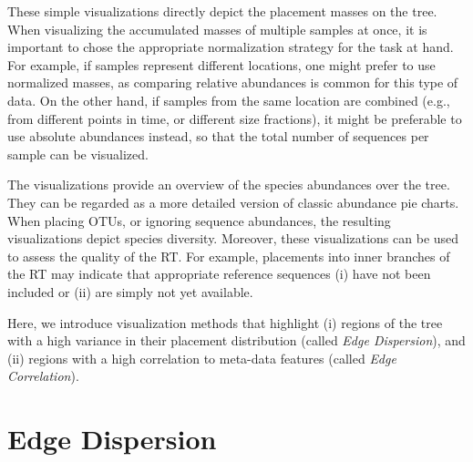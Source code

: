 These simple visualizations directly depict the placement masses on the tree.
When visualizing the accumulated masses of multiple samples at once,
it is important to chose the appropriate normalization strategy for the task at hand.
For example, if samples represent different locations, one might prefer to use normalized masses,
as comparing relative abundances is common for this type of data.
On the other hand, if samples from the same location are combined
(e.g., from different points in time, or different size fractions),
it might be preferable to use absolute abundances instead,
so that the total number of sequences per sample can be visualized.

The visualizations provide an overview of the species abundances over the tree.
They can be regarded as a more detailed version of classic abundance pie charts.
When placing OTUs, or ignoring sequence abundances, the resulting visualizations depict species diversity.
Moreover, these visualizations can be used to assess the quality of the \ac{RT}.
For example, placements into inner branches of the \ac{RT} may indicate that appropriate reference sequences
(i) have not been included or (ii) are simply not yet available.

Here, we introduce visualization methods that highlight
(i) regions of the tree with a high variance in their placement distribution (called \emph{Edge Dispersion}),
and (ii) regions with a high correlation to meta-data features (called \emph{Edge Correlation}).


\section{Edge Dispersion}
\label{ch:Visualization:sec:EdgeDispersion}

